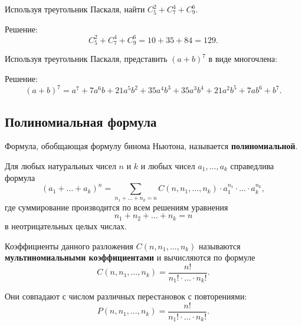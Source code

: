 \begin{example}
    Используя треугольник Паскаля, найти \(C_5^2 + C_7^4 + C_9^6\).

    Решение:
    \[
        C_5^2 + C_7^4 + C_9^6 = 10 + 35 + 84 = 129.
    \]
\end{example}

\begin{example}
    Используя треугольник Паскаля, представить \((a + b)^7\) в виде многочлена:

    Решение:
    \[
        (a + b)^7 =
        a^7 + 7 a^6 b + 21 a^5 b^2 + 35 a^4 b^3 + 35 a^3 b^4 + 21 a^2 b^5 + 7 a b^6 + b^7.
    \]
\end{example}

\subsection{Полиномиальная формула}

Формула, обобщающая формулу бинома Ньютона, называется \textbf{полиномиальной}.

\begin{theorem*}
    Для любых натуральных чисел \(n\) и \(k\) и любых чисел \(a_1, \ldots, a_k\) справедлива формула
    \[
        (a_1 + \ldots + a_k)^n =
        \sum_{n_1 + \ldots + n_k = n} C(n, n_1, \ldots, n_k) \cdot a_1^{n_1} \cdot \ldots \cdot a_k^{n_k},
    \]
    где суммирование производится по всем решениям уравнения
    \[
        n_1 + n_2 + \ldots + n_k = n
    \]
    в неотрицательных целых числах.
\end{theorem*}

Коэффициенты данного разложения \(C(n, n_1, \ldots, n_k)\) называются \textbf{мультиномиальными коэффициентами} и вычисляются по формуле
\[
    C(n, n_1, \ldots, n_k) = \frac{n!}{n_1! \cdot \ldots \cdot n_k!}.
\]

Они совпадают с числом различных перестановок с повторениями:
\[
    P(n, n_1, \ldots, n_k) = \frac{n!}{n_1! \cdot \ldots \cdot n_k!}.
\]

